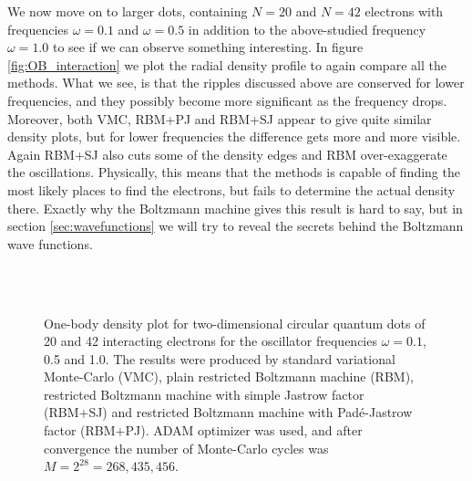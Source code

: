 We now move on to larger dots, containing $N=20$ and $N=42$ electrons with frequencies $\omega=0.1$ and $\omega=0.5$ in addition to the above-studied frequency $\omega=1.0$ to see if we can observe something interesting. In figure \eqref{fig:OB_interaction} we plot the radial density profile to again compare all the methods. What we see, is that the ripples discussed above are conserved for lower frequencies, and they possibly become more significant as the frequency drops. Moreover, both VMC, RBM+PJ and RBM+SJ appear to give quite similar density plots, but for lower frequencies the difference gets more and more visible. Again RBM+SJ also cuts some of the density edges and RBM over-exaggerate the oscillations. Physically, this means that the methods is capable of finding the most likely places to find the electrons, but fails to determine the actual density there. Exactly why the Boltzmann machine gives this result is hard to say, but in section \eqref{sec:wavefunctions} we will try to reveal the secrets behind the Boltzmann wave functions. 

\begin{figure}
	\centering
	\captionsetup[subfigure]{labelformat=empty}
	\hspace{0.1cm}
	\hspace{-0.5cm}
	\\
	
	\hspace{0.1cm}
	\hspace{-0.5cm}
	\\
	
	\hspace{0.1cm}
	\hspace{-0.5cm}
	
	\caption{One-body density plot for two-dimensional circular quantum dots of 20 and 42 interacting electrons for the oscillator frequencies $\omega=0.1$, 0.5 and 1.0. The results were produced by standard variational Monte-Carlo (VMC), plain restricted Boltzmann machine (RBM), restricted Boltzmann machine with simple Jastrow factor (RBM+SJ) and restricted Boltzmann machine with Padé-Jastrow factor (RBM+PJ). ADAM optimizer was used, and after convergence the number of Monte-Carlo cycles was $M=2^{28}=268,435,456$.}
	\label{fig:OB_interaction}
\end{figure}

